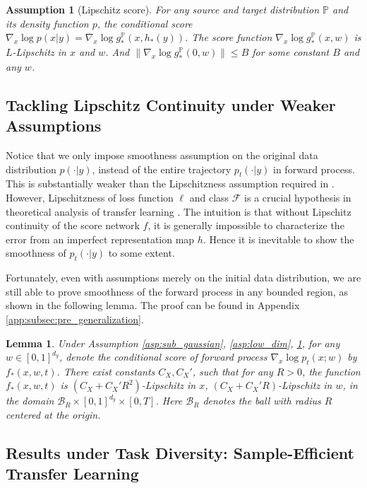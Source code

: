 \documentclass{article}
\numberwithin{equation}{section}
\newtheorem{asp}{Assumption}[section]
\newtheorem{lemma}[thm]{Lemma}
\theoremstyle{definition}
\renewcommand{\P}{\mathbb{P}}
\begin{document}
\begin{asp}[Lipschitz score]\label{asp:lip}
    For any source and target distribution $\P$ and its density function $p$, the conditional score $\nabla_x\log p(x|y)=\nabla_x\log g_*^{\P}(x,h_*(y))$. The score function $\nabla_x\log g_*^{\P}(x,w)$ is $L$-Lipschitz in $x$ and $w$.
    And $\|\nabla_x\log g_*^{\P}(0,w)\|\leq B$ for some constant $B$ and any $w$.
\end{asp}

\subsection{Tackling Lipschitz Continuity under Weaker Assumptions}
Notice that we only impose smoothness assumption on the original data distribution $p(\cdot|y)$, instead of the entire trajectory $p_t(\cdot|y)$ in forward process. 
This is substantially weaker than the Lipschitzness assumption required in \citet{chen2023score,chen2022sampling,yuan2024reward,yang2024fewshot}. 
However, Lipschitzness of loss function $\ell$ and class $\mathcal{F}$ is a crucial hypothesis in theoretical analysis of transfer learning \citep{tripuraneni2020theory,chua2021fine}.
The intuition is that without Lipschitz continuity of the score network $f$, it is generally impossible to characterize the error from an imperfect representation map $h$.
Hence it is inevitable to show the smoothness of $p_t(\cdot|y)$ to some extent. 

Fortunately, even with assumptions merely on the initial data distribution, we are still able to prove smoothness of the forward process in any bounded region, as shown in the following lemma. The proof can be found in Appendix \ref{app:subsec:pre_generalization}.
\begin{lemma}\label{lem:lip_score_informal}
    Under Assumption \ref{asp:sub_gaussian}, \ref{asp:low_dim}, \ref{asp:lip}, for any $w\in[0,1]^{d_y}$, denote the conditional score of forward process $\nabla_x\log p_t(x;w)$ by $f_*(x,w,t)$.
    There exist constants $C_X,C_X'$, such that for any $R>0$, the function $f_*(x,w,t)$ is $(C_X+C_X'R^2)$-Lipschitz in $x$, $(C_X+C_X'R)$-Lipschitz in $w$, in the domain $\mathcal{B}_R\times[0,1]^{d_y}\times [0,T]$. Here $\mathcal{B}_R$ denotes the ball with radius $R$ centered at the origin.
\end{lemma}

\subsection{Results under Task Diversity: Sample-Efficient Transfer Learning}
\end{document}
